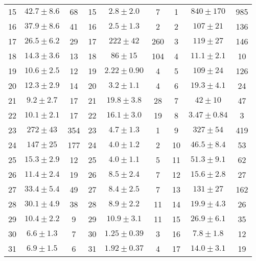 \begin{table*}[!hbtp]
{\begin{tabular}{ccc|ccc|ccc}
15   &    $42.7\pm8.6 $    &   68   &   15   &   $2.8\pm2.0 $    &   7   &   1   &    $840\pm170 $    &    985 \\
16   &    $37.9\pm8.6 $    &   41   &   16   &   $2.5\pm1.3 $    &   2   &   2   &    $107\pm21 $    &    136 \\
17   &    $26.5\pm6.2 $    &   29   &   17   &   $222\pm42 $    &   260   &   3   &    $119\pm27 $    &    146 \\
18   &    $14.3\pm3.6 $    &   13   &   18   &   $86\pm15 $    &   104   &   4   &    $11.1\pm2.1 $    &    10 \\
19   &    $10.6\pm2.5 $    &   12   &   19   &   $2.22\pm0.90 $    &   4   &   5   &    $109\pm24 $    &    126 \\
20   &    $12.3\pm2.9 $    &   14   &   20   &   $3.2\pm1.1 $    &   4   &   6   &    $19.3\pm4.1 $    &    24 \\
21   &    $9.2\pm2.7 $    &   17   &   21   &   $19.8\pm3.8 $    &   28   &   7   &    $42\pm10 $    &    47 \\
22   &    $10.1\pm2.1 $    &   17   &   22   &   $16.1\pm3.0 $    &   19   &   8   &    $3.47\pm0.84 $    &    3 \\
23   &    $272\pm43 $    &   354   &   23   &   $4.7\pm1.3 $    &   1   &   9   &    $327\pm54 $    &    419 \\
24   &    $147\pm25 $    &   177   &   24   &   $4.0\pm1.2 $    &   2   &   10   &    $46.5\pm8.4 $    &    53 \\
25   &    $15.3\pm2.9 $    &   12   &   25   &   $4.0\pm1.1 $    &   5   &   11   &    $51.3\pm9.1 $    &    62 \\
26   &    $11.4\pm2.4 $    &   19   &   26   &   $8.5\pm2.4 $    &   7   &   12   &    $15.6\pm2.8 $    &    27 \\
27   &    $33.4\pm5.4 $    &   49   &   27   &   $8.4\pm2.5 $    &   7   &   13   &    $131\pm27 $    &    162 \\
28   &    $30.1\pm4.9 $    &   38   &   28   &   $8.9\pm2.2 $    &   11   &   14   &    $19.9\pm4.3 $    &    26 \\
29   &    $10.4\pm2.2 $    &   9   &   29   &   $10.9\pm3.1 $    &   11   &   15   &    $26.9\pm6.1 $    &    35 \\
30   &    $6.6\pm1.3 $    &   7   &   30   &   $1.25\pm0.39 $    &   3   &   16   &    $7.8\pm1.8 $    &    12 \\
31   &    $6.9\pm1.5 $    &   6   &   31   &   $1.92\pm0.37 $    &   4   &   17   &    $14.0\pm3.1 $    &    19 \\

\end{tabular}}
\end{table*}

